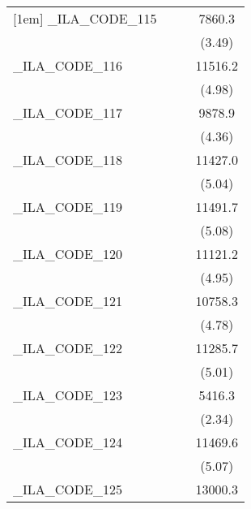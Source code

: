 {\begin{tabular}{l*{3}{c}}
[1em]
\_ILA\_CODE\_115&                     &                     &      7860.3\sym{***}\\
            &                     &                     &      (3.49)         \\
[1em]
\_ILA\_CODE\_116&                     &                     &     11516.2\sym{***}\\
            &                     &                     &      (4.98)         \\
[1em]
\_ILA\_CODE\_117&                     &                     &      9878.9\sym{***}\\
            &                     &                     &      (4.36)         \\
[1em]
\_ILA\_CODE\_118&                     &                     &     11427.0\sym{***}\\
            &                     &                     &      (5.04)         \\
[1em]
\_ILA\_CODE\_119&                     &                     &     11491.7\sym{***}\\
            &                     &                     &      (5.08)         \\
[1em]
\_ILA\_CODE\_120&                     &                     &     11121.2\sym{***}\\
            &                     &                     &      (4.95)         \\
[1em]
\_ILA\_CODE\_121&                     &                     &     10758.3\sym{***}\\
            &                     &                     &      (4.78)         \\
[1em]
\_ILA\_CODE\_122&                     &                     &     11285.7\sym{***}\\
            &                     &                     &      (5.01)         \\
[1em]
\_ILA\_CODE\_123&                     &                     &      5416.3\sym{*}  \\
            &                     &                     &      (2.34)         \\
[1em]
\_ILA\_CODE\_124&                     &                     &     11469.6\sym{***}\\
            &                     &                     &      (5.07)         \\
[1em]
\_ILA\_CODE\_125&                     &                     &     13000.3\sym{***}\\

\end{tabular}}
